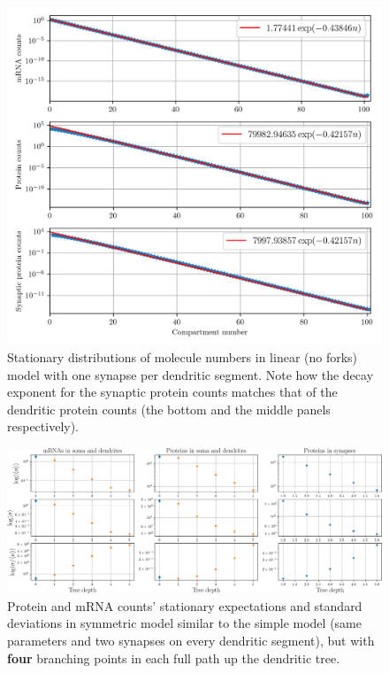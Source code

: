 \documentclass[a4paper, 11pt]{article}
\begin{document}
\begin{figure}
  \begin{center}
    \includegraphics[width=12cm]{img/linear_model_decays.png}
  \end{center}  
  \caption{Stationary distributions of molecule numbers in linear (no forks) model with one synapse per dendritic segment. Note how the decay exponent for the synaptic protein counts matches that of the dendritic protein counts (the bottom and the middle panels respectively).}
  \label{fig:linear_model_decays}
\end{figure}

\begin{figure}
  \begin{center}
    \includegraphics[width=15cm]{img/4_forks_plots_trimmed.png}
  \end{center}
    \caption{Protein and mRNA counts' stationary expectations and standard deviations in symmetric model similar to the simple model (same parameters and two synapses on every dendritic segment), but with {\bf four} branching points in each full path up the dendritic tree.}
  \label{fig:4_forks_noise}
\end{figure}
\end{document}
